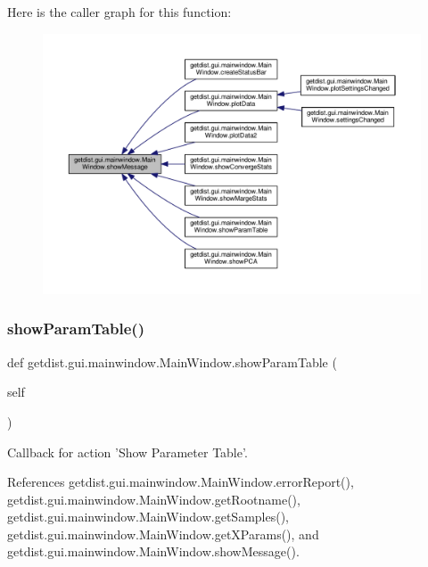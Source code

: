 Here is the caller graph for this function\+:
\nopagebreak
\begin{figure}[H]
\begin{center}
\leavevmode
\includegraphics[width=350pt]{classgetdist_1_1gui_1_1mainwindow_1_1MainWindow_a8d131b0b8b9945bd609acb00f21eb74f_icgraph}
\end{center}
\end{figure}
\mbox{\label{classgetdist_1_1gui_1_1mainwindow_1_1MainWindow_add82606cde0404943c1e1030451e586c}} 
\subsubsection{\texorpdfstring{show\+Param\+Table()}{showParamTable()}}
{\footnotesize\ttfamily def getdist.\+gui.\+mainwindow.\+Main\+Window.\+show\+Param\+Table (\begin{DoxyParamCaption}\item[{}]{self }\end{DoxyParamCaption})}

\begin{DoxyVerb}Callback for action 'Show Parameter Table'.
\end{DoxyVerb}
 

References getdist.\+gui.\+mainwindow.\+Main\+Window.\+error\+Report(), getdist.\+gui.\+mainwindow.\+Main\+Window.\+get\+Rootname(), getdist.\+gui.\+mainwindow.\+Main\+Window.\+get\+Samples(), getdist.\+gui.\+mainwindow.\+Main\+Window.\+get\+X\+Params(), and getdist.\+gui.\+mainwindow.\+Main\+Window.\+show\+Message().

